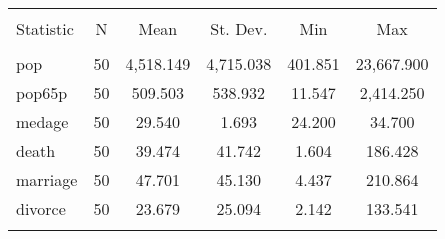 
\begin{tabular}{@{\extracolsep{5pt}}lccccc} 
\\[-1.8ex]\hline 
\hline \\[-1.8ex] 
Statistic & \multicolumn{1}{c}{N} & \multicolumn{1}{c}{Mean} & \multicolumn{1}{c}{St. Dev.} & \multicolumn{1}{c}{Min} & \multicolumn{1}{c}{Max} \\ 
\hline \\[-1.8ex] 
pop & 50 & 4,518.149 & 4,715.038 & 401.851 & 23,667.900 \\ 
pop65p & 50 & 509.503 & 538.932 & 11.547 & 2,414.250 \\ 
medage & 50 & 29.540 & 1.693 & 24.200 & 34.700 \\ 
death & 50 & 39.474 & 41.742 & 1.604 & 186.428 \\ 
marriage & 50 & 47.701 & 45.130 & 4.437 & 210.864 \\ 
divorce & 50 & 23.679 & 25.094 & 2.142 & 133.541 \\ 
\hline \\[-1.8ex] 
\end{tabular} 
